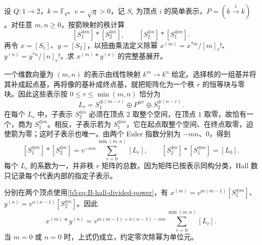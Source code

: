 \begin{exercise}\label{b5:ex:B:19}
	设 \(Q:1\to2\)，\(k=\mathbb F_q\)、\(v=\sqrt q>0\)，记 \(S_i\) 为顶点 \(i\) 的简单表示，\(P=(k\xrightarrow{1}k)\)。对任意 \(m,n\ge0\)，按箭映射的秩计算
	\[
		[S_1^{\oplus m}]*[S_2^{\oplus n}],
		\qquad [S_2^{\oplus n}]*[S_1^{\oplus m}].
	\]
	再令 \(x=[S_1]\)、\(y=[S_2]\)，以扭曲乘法定义除幂 \(x^{(m)}=x^{*m}/[m]_v!\)、\(y^{(n)}=y^{*n}/[n]_v!\)，求 \(x^{(m)}*y^{(n)}\) 的完整基展开。
\end{exercise}
\begin{solution}
	一个维数向量为 \((m,n)\) 的表示由线性映射 \(k^m\to k^n\) 给定。选择核的一组基并将其补成起点基，再将像的基补成终点基，就把矩阵化为一个秩 \(r\) 的恒等块与零块。因此这些表示按 \(0\le r\le\min(m,n)\) 恰分为
	\[
		L_r=S_1^{\oplus(m-r)}\oplus P^{\oplus r}
		\oplus S_2^{\oplus(n-r)}.
	\]
	在每个 \(L_r\) 中，子表示 \(S_2^{\oplus n}\) 必须在顶点 \(2\) 取整个空间，在顶点 \(1\) 取零，故恰有一个，商为 \(S_1^{\oplus m}\)。相反，子表示若为 \(S_1^{\oplus m}\)，它在起点取整个空间、在终点取零，迫使箭为零；这时子表示也唯一。由两个 Euler 指数分别为 \(-mn\)、\(0\)，得到
	\[
		[S_1^{\oplus m}]*[S_2^{\oplus n}]
		=v^{-mn}\sum_{r=0}^{\min(m,n)}[L_r],
		\qquad
		[S_2^{\oplus n}]*[S_1^{\oplus m}]=[L_0].
	\]
	每个 \(L_r\) 的系数为一，并非秩 \(r\) 矩阵的总数，因为矩阵已按表示同构分类，Hall 数只记录每个代表内部的指定子表示。

	分别在两个顶点使用\eqref{b5:eq:B-hall-divided-power}，有 \(x^{(m)}=v^{m(m-1)}[S_1^{\oplus m}]\)、\(y^{(n)}=v^{n(n-1)}[S_2^{\oplus n}]\)。因此
	\[
		x^{(m)}*y^{(n)}
		=v^{m(m-1)+n(n-1)-mn}
		\sum_{r=0}^{\min(m,n)}[L_r].
	\]
	当 \(m=0\) 或 \(n=0\) 时，上式仍成立，约定零次除幂为单位元。
\end{solution}

